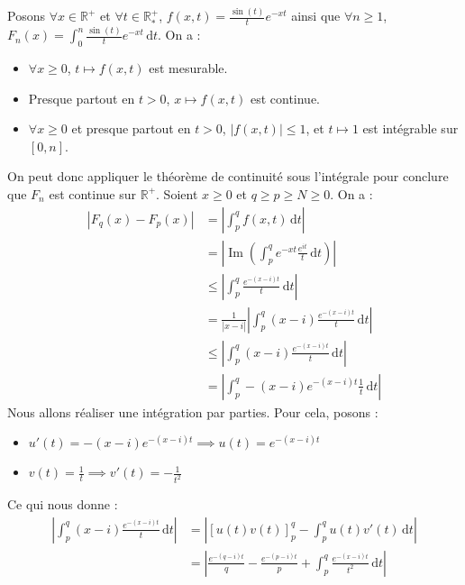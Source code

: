 	\begin{demonstration}
		Posons $\forall x \in \mathbb{R}^+$ et $\forall t \in \mathbb{R}^+_*$, $f(x,t) = \frac{\sin(t)}{t} e^{-xt}$ ainsi que $\forall n \geq 1$, $F_n(x) = \int_0^n \frac{\sin(t)}{t} e^{-xt} \, \mathrm{d}t$. On a :
		\begin{itemize}
			\item $\forall x \geq 0$, $t \mapsto f(x, t)$ est mesurable.
			\item Presque partout en $t > 0$, $x \mapsto f(x, t)$ est continue.
			\item $\forall x \geq 0$ et presque partout en $t > 0$, $|f(x,t)| \leq 1$, et $t \mapsto 1$ est intégrable sur $[0,n]$.
		\end{itemize}
		On peut donc appliquer le théorème de continuité sous l'intégrale pour conclure que $F_n$ est continue sur $\mathbb{R}^+$.
		\newpar
		Soient $x \geq 0$ et $q \geq p \geq N \geq 0$. On a :
		\begin{align*}
			|F_q(x) - F_p(x)| &= \left| \int_p^q f(x,t) \, \mathrm{d}t \right| \\
			&= \left| \operatorname{Im} \left( \int_p^q e^{-xt} \frac{e^{it}}{t} \, \mathrm{d}t \right) \right| \\
			&\leq \left| \int_p^q \frac{e^{-(x-i)t}}{t} \, \mathrm{d}t \right| \\
			&= \frac{1}{|x-i|} \left| \int_p^q (x-i) \frac{e^{-(x-i)t}}{t} \, \mathrm{d}t \right| \\
			&\leq \left| \int_p^q (x-i) \frac{e^{-(x-i)t}}{t} \, \mathrm{d}t \right| \\
			&= \left| \int_p^q -(x-i) e^{-(x-i)t} \frac{1}{t} \, \mathrm{d}t \right|
		\end{align*}
		Nous allons réaliser une intégration par parties. Pour cela, posons :
		\begin{itemize}
			\item $u'(t) = -(x-i) e^{-(x-i)t} \implies u(t) = e^{-(x-i)t}$
			\item $v(t) = \frac{1}{t} \implies v'(t) = -\frac{1}{t^2}$
		\end{itemize}
		Ce qui nous donne :
		\begin{align*}
			\left| \int_p^q (x-i) \frac{e^{-(x-i)t}}{t} \, \mathrm{d}t \right| &= \left| \left[ u(t)v(t) \right]_p^q - \int_p^q u(t) v'(t) \, \mathrm{d}t \right| \\
			&= \left| \frac{e^{-(q-i)t}}{q} - \frac{e^{-(p-i)t}}{p} +  \int_p^q \frac{e^{-(x-i)t}}{t^2} \, \mathrm{d}t \right|
		\end{align*}

\end{demonstration}
